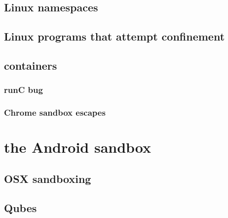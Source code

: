 \subsection{Linux namespaces}




\subsection{Linux programs that attempt confinement}


\subsection{containers}



\subsubsection{runC bug}


\subsubsection{Chrome sandbox escapes}



\section{the Android sandbox}



\subsection{OSX sandboxing}

\subsection{Qubes}


